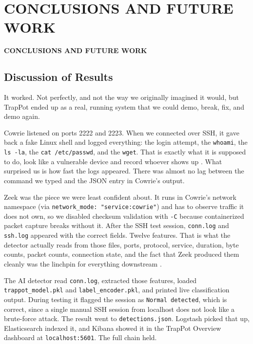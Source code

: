 \chapter{CONCLUSIONS AND FUTURE WORK}
\pagebreak

\begin{center}
{\LARGE\textbf{CONCLUSIONS AND FUTURE WORK}}
\end{center}


\section{Discussion of Results}
\label{sec:discussion_of_results}

It worked. Not perfectly, and not the way we originally imagined it would, but TrapPot ended up as a real, running system that we could demo, break, fix, and demo again.

Cowrie listened on ports 2222 and 2223. When we connected over SSH, it gave back a fake Linux shell and logged everything: the login attempt, the \texttt{whoami}, the \texttt{ls -la}, the \texttt{cat /etc/passwd}, and the \texttt{wget}. That is exactly what it is supposed to do, look like a vulnerable device and record whoever shows up \cite{9071014,9359711}. What surprised us is how fast the logs appeared. There was almost no lag between the command we typed and the JSON entry in Cowrie's output.

Zeek was the piece we were least confident about. It runs in Cowrie's network namespace (via \texttt{network\_mode: "service:cowrie"}) and has to observe traffic it does not own, so we disabled checksum validation with \texttt{-C} because containerized packet capture breaks without it. After the SSH test session, \texttt{conn.log} and \texttt{ssh.log} appeared with the correct fields. Twelve features. That is what the detector actually reads from those files, ports, protocol, service, duration, byte counts, packet counts, connection state, and the fact that Zeek produced them cleanly was the linchpin for everything downstream \cite{lanz2025optimizing,rodriguezgomez2025systematic}.

The AI detector read \texttt{conn.log}, extracted those features, loaded \texttt{trappot\_model.pkl} and \texttt{label\_encoder.pkl}, and printed live classification output. During testing it flagged the session as \texttt{Normal detected}, which is correct, since a single manual SSH session from localhost does not look like a brute-force attack. The result went to \texttt{detections.json}. Logstash picked that up, Elasticsearch indexed it, and Kibana showed it in the TrapPot Overview dashboard at \texttt{localhost:5601}. The full chain held.

